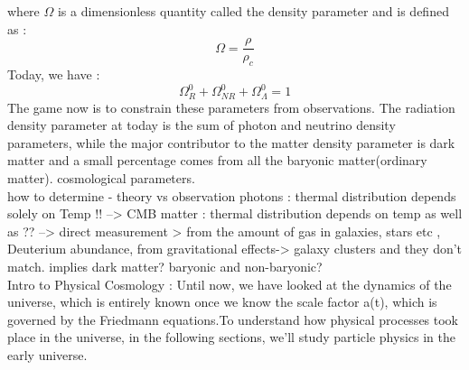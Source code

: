 \documentclass[12pt,a4paper,oneside]{book}
\begin{document}
where $\Omega$ is a dimensionless quantity called the density parameter and is defined as :
\begin{equation}
    \Omega = \frac{\rho}{\rho_{c}}
\end{equation}
Today, we have :
\begin{equation}
    \Omega^{0}_{R} + \Omega^{0}_{NR} +\Omega^{0}_{\Lambda} =1
\end{equation}
The game now is to  constrain these parameters from observations. The radiation density parameter at today is the sum of photon and neutrino density parameters, while the major contributor to the matter density parameter is dark matter and a small percentage comes from all the baryonic matter(ordinary matter).
cosmological parameters.
\\ how to determine - theory vs observation
photons : thermal distribution depends solely on Temp !! --> CMB
matter :  thermal distribution depends on temp as well as ?? --> direct measurement > from the amount of gas in galaxies, stars etc , Deuterium abundance, from gravitational effects-> galaxy clusters and they don't match. implies dark matter? baryonic and non-baryonic?  
\\ Intro to Physical Cosmology :  Until now, we have looked at the dynamics of the universe, which is entirely known once we know the scale factor a(t), which is governed by the Friedmann equations.To understand how physical processes took place in the universe, in the following sections, we'll study particle physics in the early universe.  
\end{document}
